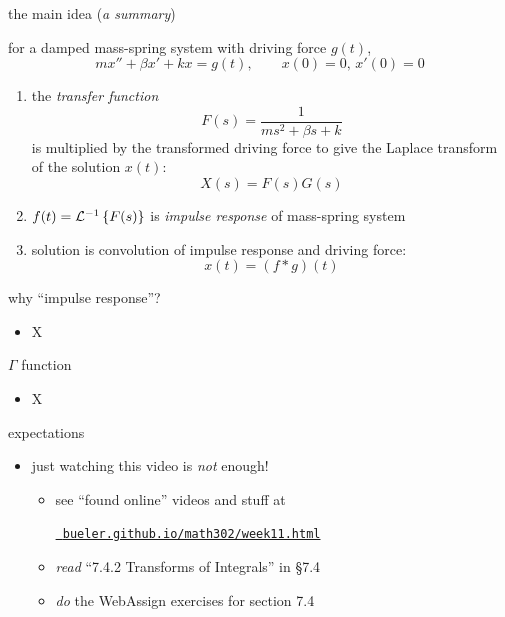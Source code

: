 \documentclass[urlcolor=blue,dvipsnames]{beamer}
\begin{document}
\begin{frame}{the main idea (\emph{a summary})}

for a damped mass-spring system with driving force $g(t)$,
\begin{equation*}
m x'' + \beta x' + k x = g(t), \qquad x(0)=0, \, x'(0)=0
\end{equation*}

\begin{enumerate}
\item the \emph{transfer function}
    $$F(s) = \frac{1}{ms^2+\beta s+k}$$
is multiplied by the transformed driving force to give the Laplace transform of the solution $x(t)$:
    $$X(s) = F(s) G(s)$$
\item $f(t)=\mathcal{L}^{-1}\left\{F(s)\right\}$ is \emph{impulse response} of mass-spring system
\item solution is convolution of impulse response and driving force:
    $$x(t) = (f * g)(t)$$
\end{enumerate}
\end{frame}


\begin{frame}{why ``impulse response''?}
\begin{itemize}
\item X
\end{itemize}
\end{frame}

\begin{frame}{$\Gamma$ function}
\begin{itemize}
\item X
\end{itemize}
\end{frame}


\begin{frame}{expectations}

\begin{itemize}
\item just watching this video is \emph{not} enough!
     \begin{itemize}
     \item see ``found online'' videos and stuff at

     \centerline{\href{https://bueler.github.io/math302/week11.html}{\tt \color{cyan} bueler.github.io/math302/week11.html}}
     \item \emph{read} ``7.4.2 Transforms of Integrals'' in \S7.4
     \item \emph{do} the WebAssign exercises for section 7.4
     \end{itemize}
\end{itemize}
\end{frame}
\end{document}
